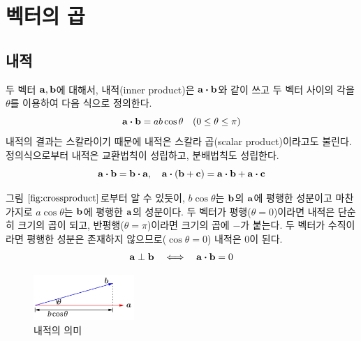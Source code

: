 \documentclass[a4paper,twoside,11pt]{book}
\begin{document}
\section{벡터의 곱}

\subsection{내적}
두 벡터 $\vb{a}, \vb{b}$에 대해서, 내적(inner product)은 $\vb{a} \vdot \vb{b}$와 같이 쓰고 두 벡터 사이의 각을 $\theta$를 이용하여 다음 식으로 정의한다.
\[\vb{a} \vdot \vb{b} = ab \cos{\theta} \quad (0 \leq \theta \leq \pi)
\]
내적의 결과는 스칼라이기 때문에 내적은 스칼라 곱(scalar product)이라고도 불린다. 정의식으로부터 내적은 교환법칙이 성립하고, 분배법칙도 성립한다.
\[\vb{a} \vdot \vb{b} = \vb{b} \vdot \vb{a}, \quad \vb{a} \vdot (\vb{b} + \vb{c}) = \vb{a} \vdot \vb{b} + \vb{a} \vdot \vb{c}
\]

그림 $\ref{fig:crossproduct}$로부터 알 수 있듯이, $b \cos{\theta}$는 $\vb{b}$의 $\vb{a}$에 평행한 성분이고 마찬가지로 $a \cos{\theta}$는 $\vb{b}$에 평행한 $\vb{a}$의 성분이다. 두 벡터가 평행($\theta = 0$)이라면 내적은 단순히 크기의 곱이 되고, 반평행($\theta = \pi$)이라면 크기의 곱에 $-$가 붙는다. 두 벡터가 수직이라면 평행한 성분은 존재하지 않으므로($\cos{\theta}=0$) 내적은 0이 된다.
\[
  \vb{a} \perp \vb{b} \quad \Longleftrightarrow \quad \vb{a} \vdot \vb{b} = 0
\]

\begin{figure}
  \centering
  \includegraphics[width=0.34\textwidth]{images/fig1-4}
  \caption{내적의 의미}
  \label{fig:crossproduct}
\end{figure}
\end{document}
